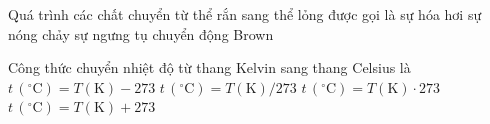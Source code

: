 	\begin{ex}%
		Quá trình các chất chuyển từ thể rắn sang thể lỏng được gọi là
		\choice
		{sự hóa hơi}
		{\True sự nóng chảy}
		{sự ngưng tụ}
		{chuyển động Brown}
	\end{ex}

	\begin{ex}%
		Công thức chuyển nhiệt độ từ thang Kelvin sang thang Celsius là
		\choice
		{\True $t\,(^\circ\text{C})=T(\text{K})-273$}
		{$t\,(^\circ\text{C})=T(\text{K})/273$}
		{$t\,(^\circ\text{C})=T(\text{K})\cdot 273$}
		{$t\,(^\circ\text{C})=T(\text{K})+273$}
	\end{ex}

